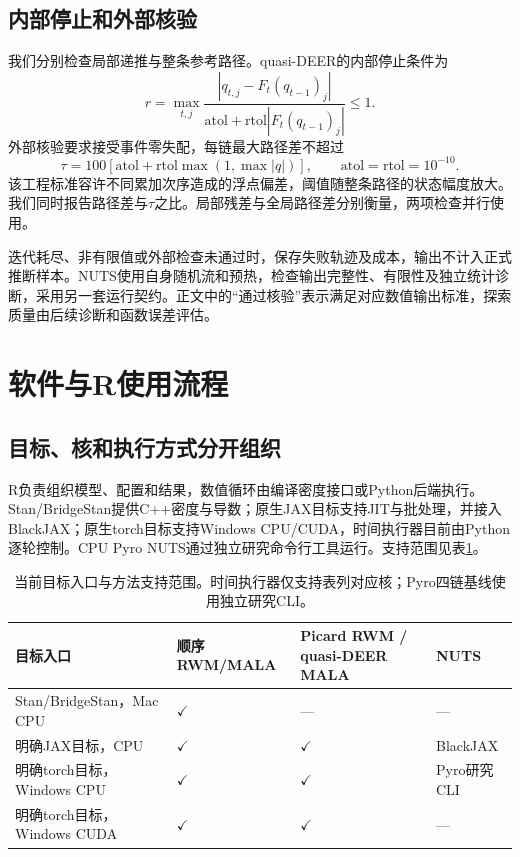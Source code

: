 \documentclass[UTF8,fontset=fandol,zihao=-4]{ctexart}
\begin{document}
\subsection{内部停止和外部核验}
我们分别检查局部递推与整条参考路径。quasi-DEER的内部停止条件为
\begin{equation}
r=\max_{t,j}\frac{|q_{t,j}-F_t(q_{t-1})_j|}{\mathrm{atol}+\mathrm{rtol}|F_t(q_{t-1})_j|}\le1.
\end{equation}
外部核验要求接受事件零失配，每链最大路径差不超过
\begin{equation}\label{eq:tolerance}
\tau=100[\mathrm{atol}+\mathrm{rtol}\max(1,\max|q|)],\qquad
\mathrm{atol}=\mathrm{rtol}=10^{-10}.
\end{equation}
该工程标准容许不同累加次序造成的浮点偏差，阈值随整条路径的状态幅度放大。我们同时报告路径差与$\tau$之比。局部残差与全局路径差分别衡量，两项检查并行使用。

迭代耗尽、非有限值或外部检查未通过时，保存失败轨迹及成本，输出不计入正式推断样本。NUTS使用自身随机流和预热，检查输出完整性、有限性及独立统计诊断，采用另一套运行契约。正文中的“通过核验”表示满足对应数值输出标准，探索质量由后续诊断和函数误差评估。

\section{软件与R使用流程}
\subsection{目标、核和执行方式分开组织}
R负责组织模型、配置和结果，数值循环由编译密度接口或Python后端执行。Stan/BridgeStan提供C++密度与导数\cite{stan,bridgestan}；原生JAX目标支持JIT与批处理，并接入BlackJAX\cite{blackjax}；原生torch目标支持Windows CPU/CUDA，时间执行器目前由Python逐轮控制。CPU Pyro NUTS\cite{pyro}通过独立研究命令行工具运行。支持范围见表\ref{tab:capabilities}。
\begin{table}[htbp]\centering\small
\begin{tabular}{p{.29\linewidth}p{.15\linewidth}p{.31\linewidth}p{.14\linewidth}}\toprule
目标入口 & 顺序RWM/MALA & Picard RWM / quasi-DEER MALA & NUTS\\\midrule
Stan/BridgeStan，Mac CPU & $\checkmark$ & --- & ---\\
明确JAX目标，CPU & $\checkmark$ & $\checkmark$ & BlackJAX\\
明确torch目标，Windows CPU & $\checkmark$ & $\checkmark$ & Pyro研究CLI\\
明确torch目标，Windows CUDA & $\checkmark$ & $\checkmark$ & ---\\\bottomrule
\end{tabular}
\caption{当前目标入口与方法支持范围。时间执行器仅支持表列对应核；Pyro四链基线使用独立研究CLI。}\label{tab:capabilities}
\end{table}
\end{document}
